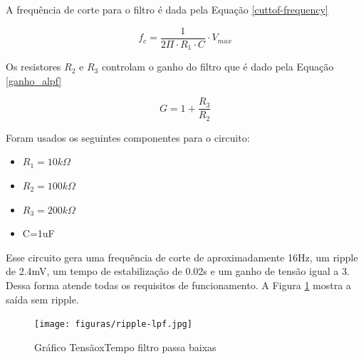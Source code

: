 A frequência de corte para o filtro é dada pela Equação \ref{cuttof-frequency}

\begin{equation}\label{cutoff-frequency}
	f_{c}=\frac{ 1 }{ 2 \Pi \cdot R_{1}\cdot C } \cdot V_{max}
\end{equation}

Os resistores $R_{2}$ e $R_{3}$ controlam o ganho do filtro que é dado pela Equação \ref{ganho_alpf}

\begin{equation}\label{calc-analog-voltage}
	G= 1 + \frac{ R_{3} }{ R_{2} }
\end{equation}

Foram usados os seguintes componentes para o circuito:

\begin{itemize}
	\item $R_{1}=10k\Omega$
	\item $R_{2}=100k\Omega$
	\item $R_{3}=200k\Omega$
	\item C=1uF
\end{itemize}

Esse circuito gera uma frequência de corte de aproximadamente 16Hz, um ripple de 2.4mV, um tempo de estabilização de 0.02s e um ganho de tensão igual a 3. Dessa forma atende todas os requisitos de funcionamento. A Figura \ref{filter_out} mostra a saída sem ripple.

\begin{figure}[htbp]
	\centering
	\texttt{[image: figuras/ripple-lpf.jpg]}
	\caption{Gráfico TensãoxTempo filtro passa baixas}
	\label{filter_out}
\end{figure}

